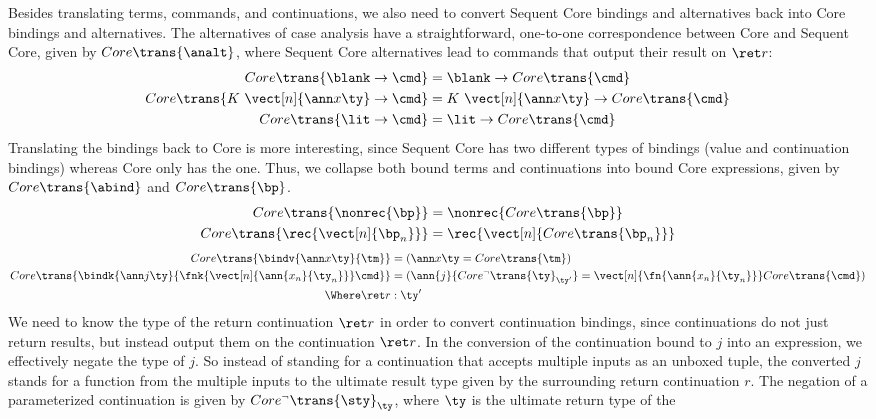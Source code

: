 \documentclass{article}
\begin{document}
Besides translating terms, commands, and continuations, we also need to convert
Sequent Core bindings and alternatives back into Core bindings and alternatives.
The alternatives of case analysis have a straightforward, one-to-one
correspondence between Core and Sequent Core, given by $Core\trans{\analt}$,
where Sequent Core alternatives lead to commands that output their result on
$\ret r$:
\begin{align*}
  Core\trans{\blank \to \cmd}%
  &=
  \blank \to Core\trans{\cmd}%
  \\
  Core\trans{K ~ \vect[n]{\ann x \ty} \to \cmd}%
  &=
  K ~ \vect[n]{\ann x \ty} \to Core\trans{\cmd}%
  \\
  Core\trans{\lit \to \cmd}%
  &=
  \lit \to Core\trans{\cmd}%
\end{align*}
Translating the bindings back to Core is more interesting, since Sequent Core
has two different types of bindings (value and continuation bindings) whereas
Core only has the one.  Thus, we collapse both bound terms and continuations
into bound Core expressions, given by $Core\trans{\abind}$ and
$Core\trans{\bp}$.
\begin{align*}
  Core\trans{\nonrec{\bp}}
  &=
  \nonrec{Core\trans{\bp}}
  \\
  Core\trans{\rec{\vect[n]{\bp_n}}}
  &=
  \rec{\vect[n]{Core\trans{\bp_n}}}
\end{align*}
\begin{align*}
  Core\trans{\bindv{\ann x \ty}{\tm}}
  &=
  (\ann x \ty = Core\trans{\tm})
  \\
  Core\trans{
    \bindk{\ann j \ty}{\fnk{\vect[n]{\ann{x_n}{\ty_n}}}\cmd}
  }
  &=
  (
    \ann{j}{Core^\neg\trans{\ty}_{\ty'}}
    =
    \vect[n]{\fn{\ann{x_n}{\ty_n}}} Core\trans{\cmd}
    )
  \\
  \Where
  \ret r &: \ty'
\end{align*}
We need to know the type of the return continuation $\ret r$ in order to convert
continuation bindings, since continuations do not just return results, but
instead output them on the continuation $\ret r$.  In the conversion of the
continuation bound to $j$ into an expression, we effectively negate the type of
$j$.  So instead of standing for a continuation that accepts multiple inputs as
an unboxed tuple, the converted $j$ stands for a function from the multiple
inputs to the ultimate result type given by the surrounding return continuation
$r$.  The negation of a parameterized continuation is given by
$Core^\neg\trans{\sty}_{\ty}$, where $\ty$ is the ultimate return type of the
\end{document}
